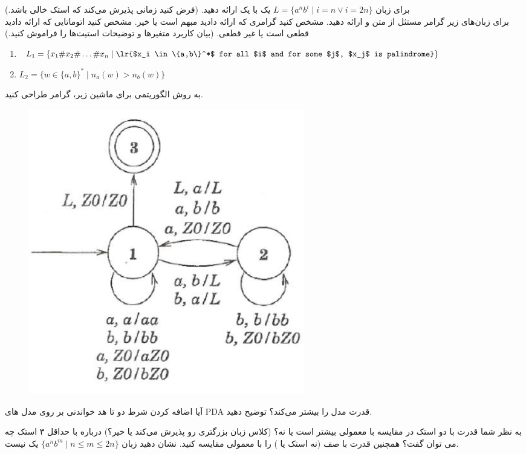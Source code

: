 \begin{enumerate}
		\CircledEnumi
		برای زبان 
		$L = \{a^nb^i \;|\; i=n \vee i=2n\}$
		 یک  با یک  ارائه دهید. (فرض کنید  زمانی پذیرش می‌کند که استک خالی باشد.)
		\\
		\CircledEnumi
		برای زبان‌های زیر گرامر مستثل از متن و  ارائه دهید. مشخص کنید گرامری که ارائه دادید مبهم است یا خیر. مشخص کنید اتوماتایی که ارائه دادید قطعی است یا غیر قطعی. (بیان کاربرد متغیر‌ها و توضیحات استیت‌ها را فراموش کنید.)

		\begin{enumerate}
			\item 
			$L_1 = \{x_1\# x_2 \# \dots \# x_n \;|\; \text{\lr{$x_i \in  \{a,b\}^*$ for all $i$ and for some $j$, $x_j$ is palindrome}} \}$
			\item 
			$L_2 = \{w \in \{a,b\}^* \; | \; n_a(w) > n_b(w)\}$
		\end{enumerate}

		\CircledEnumi
		به روش الگوریتمی برای ماشین زیر، گرامر طراحی کنید.
		\begin{figure}[h]
			\centering
			\includegraphics[width=0.4\linewidth]{image2}
		\end{figure}
		\CircledEnumi
		آیا اضافه کردن شرط دو تا هد خواندنی بر روی مدل های PDA قدرت مدل را بیشتر می‌کند؟ توضیح دهید.
	
		\CircledEnumi
		به نظر شما قدرت  با دو استک در مقایسه با  معمولی بیشتر است یا نه؟ (کلاس زبان بزرگتری رو پذیرش می‌کند یا خیر؟) درباره  با حداقل ۳ استک چه می توان گفت؟
		\CircledEnumi
		همچنین قدرت  با صف  (نه استک یا ) را با  معمولی مقایسه کنید.
		\CircledEnumi
		نشان دهید زبان
		 $\{a^nb^m \;|\; n \leq m \leq 2n\}$ 
		  یک  نیست.
		 
	\end{enumerate}
